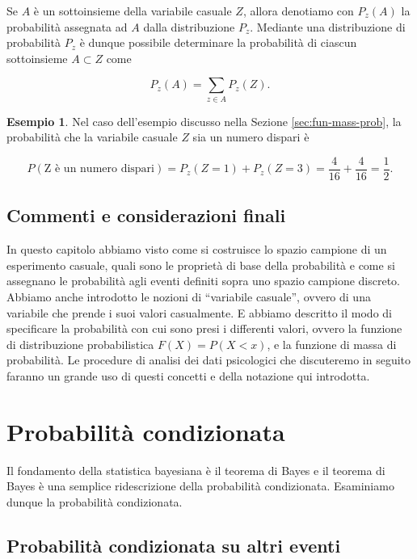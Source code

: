 \documentclass[
  11pt,
]{krantz}
\theoremstyle{definition}
\theoremstyle{definition}
\newtheorem{example}{Esempio}[chapter]
\theoremstyle{definition}
\theoremstyle{definition}
\theoremstyle{remark}
\begin{document}
Se \(A\) è un sottoinsieme della variabile casuale \(Z\), allora denotiamo con \(P_{z}(A)\) la probabilità assegnata ad \(A\) dalla distribuzione \(P_{z}\). Mediante una distribuzione di probabilità \(P_{z}\) è dunque possibile determinare la probabilità di ciascun sottoinsieme \(A \subset Z\) come

\[
P_{z}(A) = \sum_{z \in A} P_{z}(Z).
\]

\begin{example}
Nel caso dell'esempio discusso nella Sezione \ref{sec:fun-mass-prob}, la probabilità che la variabile casuale \(Z\) sia un numero dispari è

\[
P(\text{Z è un numero dispari}) = P_{z}(Z = 1) + P_{z}(Z = 3) = \frac{4}{16} + \frac{4}{16} = \frac{1}{2}.
\]
\end{example}

\hypertarget{commenti-e-considerazioni-finali}{%
\section*{Commenti e considerazioni finali}\label{commenti-e-considerazioni-finali}}


In questo capitolo abbiamo visto come si costruisce lo spazio campione di un esperimento casuale, quali sono le proprietà di base della probabilità e come si assegnano le probabilità agli eventi definiti sopra uno spazio campione discreto. Abbiamo anche introdotto le nozioni di ``variabile casuale'', ovvero di una variabile che prende i suoi valori casualmente. E abbiamo descritto il modo di specificare la probabilità con cui sono presi i differenti valori, ovvero la funzione di distribuzione probabilistica \(F(X) = P(X < x)\), e la funzione di massa di probabilità. Le procedure di analisi dei dati psicologici che discuteremo in seguito faranno un grande uso di questi concetti e della notazione qui introdotta.

\hypertarget{chapter-prob-cond}{%
\chapter{Probabilità condizionata}\label{chapter-prob-cond}}

Il fondamento della statistica bayesiana è il teorema di Bayes e il teorema di Bayes è una semplice ridescrizione della probabilità condizionata. Esaminiamo dunque la probabilità condizionata.

\hypertarget{sec:bayes-cancer}{%
\section{Probabilità condizionata su altri eventi}\label{sec:bayes-cancer}}
\end{document}
